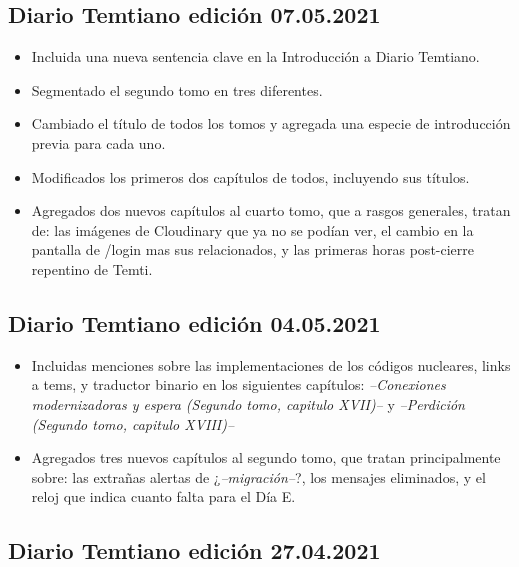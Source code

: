 \documentclass[
]{book}
\begin{document}
\hypertarget{diario-temtiano-ediciuxf3n-07.05.2021}{%
\subsection*{Diario Temtiano edición 07.05.2021}\label{diario-temtiano-ediciuxf3n-07.05.2021}}

\begin{itemize}
\item[$\boxtimes$]
  Incluida una nueva sentencia clave en la Introducción a Diario Temtiano.
\item[$\boxtimes$]
  Segmentado el segundo tomo en tres diferentes.
\item[$\boxtimes$]
  Cambiado el título de todos los tomos y agregada una especie de introducción previa para cada uno.
\item[$\boxtimes$]
  Modificados los primeros dos capítulos de todos, incluyendo sus títulos.
\item[$\boxtimes$]
  Agregados dos nuevos capítulos al cuarto tomo, que a rasgos generales, tratan de: las imágenes de Cloudinary que ya no se podían ver, el cambio en la pantalla de /login mas sus relacionados, y las primeras horas post-cierre repentino de Temti.
\end{itemize}

\hypertarget{diario-temtiano-ediciuxf3n-04.05.2021}{%
\subsection*{Diario Temtiano edición 04.05.2021}\label{diario-temtiano-ediciuxf3n-04.05.2021}}

\begin{itemize}
\item[$\boxtimes$]
  Incluidas menciones sobre las implementaciones de los códigos nucleares, links a tems, y traductor binario en los siguientes capítulos: \emph{--Conexiones modernizadoras y espera (Segundo tomo, capitulo XVII)--} y \emph{--Perdición (Segundo tomo, capitulo XVIII)--}
\item[$\boxtimes$]
  Agregados tres nuevos capítulos al segundo tomo, que tratan principalmente sobre: las extrañas alertas de ¿\emph{--migración--}?, los mensajes eliminados, y el reloj que indica cuanto falta para el Día E.
\end{itemize}

\hypertarget{diario-temtiano-ediciuxf3n-27.04.2021}{%
\subsection*{Diario Temtiano edición 27.04.2021}\label{diario-temtiano-ediciuxf3n-27.04.2021}}
\end{document}
